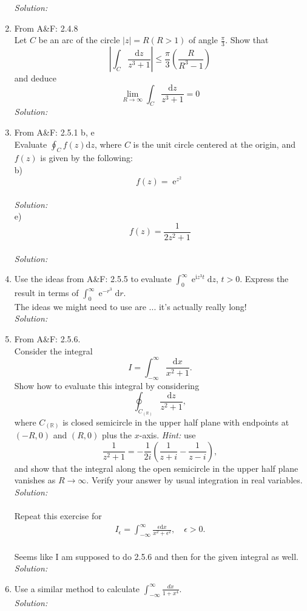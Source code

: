 \documentclass[10pt]{amsart}
\newcommand{\D}{\mathrm{d}}
\newcommand{\I}{\mathrm{i}}
\DeclareMathOperator{\E}{e}
\theoremstyle{nonumberplain}
\begin{document}
\begin{enumerate}[label={\bf {\arabic*}:}]
$$$$
\textit{Solution:} \\
\item From A\&F: 2.4.8 \\
Let $C$ be an arc of the circle $\left|z\right| = R(R > 1)$ of angle $\frac{\pi}{3}$.
Show that 
$$
\left| \int_C \frac{\D z}{z^3 + 1} \right| \leq \frac \pi 3 \left( \frac{R}{R^3 - 1} \right)
$$
and deduce
$$
\lim_{R \rightarrow \infty} \int_C \frac{\D z}{z^3 + 1} = 0
$$
\textit{Solution:} \\
\item From A\&F: 2.5.1 b, e \\
Evaluate $\oint_C f(z)\D z$, where $C$ is the unit circle centered at the origin, and $f(z)$ is given by the following: \\
b) $$f(z) = \E^{z^2}$$ \\
\textit{Solution:} \\
e) $$f(z) = \frac{1}{2z^2 + 1} $$ \\
\textit{Solution:} \\
\item Use the ideas from A\&F: 2.5.5 to evaluate $\int_0^\infty \E^{\I
    z^3 t} \D z$, $t > 0$.  Express the result in terms of $\int_0^\infty \E^{-
    r^3} \D r$. \\
The ideas we might need to use are ... it's actually really long! \\
\textit{Solution:}\\
\item From A\&F: 2.5.6. \\
Consider the integral $$I = \int_{-\infty}^{\infty} \frac{\D x}{x^2 + 1}.$$
Show how to evaluate this integral by considering
$$\oint_{C_{(\mathbb R)}} \frac{\D z}{z^2 + 1},$$
where $C_{(\mathbb R)}$ is closed semicircle in the upper half plane with endpoints at $(-R, 0)$ and $(R, 0)$ plus the $x$-axis.
\textit{Hint:} use
$$\frac{1}{z^2 + 1} = -\frac{1}{2i}\left(\frac{1}{z + i} - \frac{1}{z - i}\right),$$
and show that the integral along the open semicircle in the upper half plane vanishes as $R \rightarrow \infty$.
Verify your answer by usual integration in real variables.
\textit{Solution:}\\
\\

\noindent
Repeat this exercise for
  \begin{align*}
    I_\epsilon = \int_{-\infty}^\infty \frac{\epsilon \D x}{x^2 +
    \epsilon^2}, \quad \epsilon > 0.
  \end{align*}\\
Seems like I am supposed to do 2.5.6 and then for the given integral as well. \\
\textit{Solution:}\\
\item Use a similar method to calculate
  $\int_{-\infty}^{\infty} \frac{d x}{1+x^4}$. \\
\textit{Solution:}\\


\end{enumerate}
\end{document}
